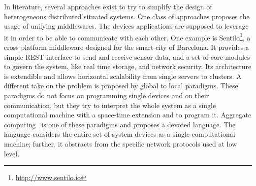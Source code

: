 In literature, several approaches exist to try to simplify the design of heterogeneous distributed situated systems.
One class of approaches proposes the usage of unifying middlewares.
The devices applications are supposed to leverage it in order to be able to communicate with each other.
One example is Sentilo\footnote{\href{http://www.sentilo.io}{http://www.sentilo.io}}, a cross platform middleware designed for the smart-city of Barcelona.
It provides a simple REST interface to send and receive sensor data, and a set of core modules to govern the system, like real time storage, and network security. 
Its architecture is extendible and allows horizontal scalability from single servers to clusters.
A different take on the problem is proposed by global to local paradigms.
These paradigms do not focus on programming single devices and on their communication, but they try to interpret the whole system as a single computational machine with a space-time extension and to program it.
Aggregate computing~\cite{BealIEEEComputer2015} is one of these paradigms and proposes a devoted language.
The language considers the entire set of system devices as a single computational machine; further, it abstracts from the specific network protocols used at low level.

